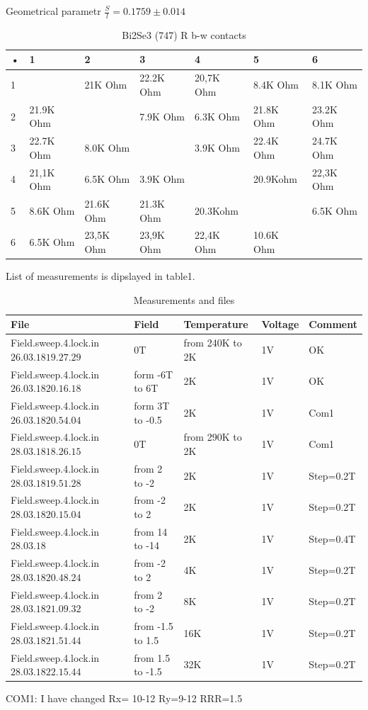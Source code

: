 \documentclass[idxtotoc,hyperref,openany,oneside]{labbook} %
\begin{document}
Geometrical parametr $\frac{S}{l}=0.1759\pm0.014$
\newline
\begin{table}[H]
\begin{tabular}{l l l l l l l}
\toprule
\textbf{•} & \textbf{1} & \textbf{2} & \textbf{3}& \textbf{4}& \textbf{5}& \textbf{6}\\
\toprule
 1&   & 21K Ohm & 22.2K Ohm & 20,7K Ohm & 8.4K Ohm & 8.1K Ohm\\
 2 & 21.9K Ohm &  &7.9K Ohm & 6.3K Ohm & 21.8K Ohm &23.2K Ohm\\
 3 & 22.7K Ohm & 8.0K Ohm & & 3.9K Ohm & 22.4K Ohm & 24.7K Ohm\\
 4 & 21,1K Ohm & 6.5K Ohm &3.9K Ohm &  & 20.9Kohm & 22,3K Ohm\\
 5 &8.6K Ohm  & 21.6K Ohm &21.3K Ohm  &20.3Kohm & &6.5K Ohm  \\
 6 & 6.5K Ohm & 23,5K Ohm &23,9K Ohm &22,4K Ohm &10.6K Ohm  &\\
\bottomrule
\end{tabular}
\caption{Bi2Se3 (747) R b-w contacts}
\label{tab:Bi2Se3 (747) R b-w contacts}
\end{table}

List of measurements is dipslayed in  table1.
 \begin{table}[H]
\begin{tabular}{l l l l l}
\toprule
\textbf{File} & \textbf{Field} & \textbf{Temperature}& \textbf{Voltage}& \textbf{Comment}\\
\toprule
Field.sweep.4.lock.in$26.03.18 19.27.29$& 0T  & from 240K to 2K & 1V& OK\\
Field.sweep.4.lock.in$26.03.18 20.16.18$& form -6T to 6T  & 2K & 1V& OK\\
Field.sweep.4.lock.in$26.03.18 20.54.04$& form 3T to -0.5  & 2K & 1V& Com1\\
Field.sweep.4.lock.in$28.03.18 18.26.15$& 0T  & from 290K to 2K & 1V& Com1\\
Field.sweep.4.lock.in$28.03.18 19.51.28$& from 2 to -2  &  2K & 1V&Step=0.2T\\
Field.sweep.4.lock.in$28.03.18 20.15.04$& from -2 to 2  &  2K & 1V&Step=0.2T\\
Field.sweep.4.lock.in$28.03.18 $& from 14 to -14  &  2K & 1V&Step=0.4T\\
Field.sweep.4.lock.in$28.03.18 20.48.24$& from -2 to 2  &  4K & 1V&Step=0.2T\\
Field.sweep.4.lock.in$28.03.18 21.09.32$& from 2 to -2  &  8K & 1V&Step=0.2T\\
Field.sweep.4.lock.in$28.03.18 21.51.44$& from -1.5 to 1.5  &  16K & 1V&Step=0.2T\\
Field.sweep.4.lock.in$28.03.18 22.15.44$& from 1.5 to -1.5  &  32K & 1V&Step=0.2T\\


\bottomrule
\end{tabular}
\caption{Measurements and files}
\label{tab:Measurements and files}
\end{table}
COM1: I have changed
Rx= 10-12
Ry=9-12
RRR=1.5
\end{document}
